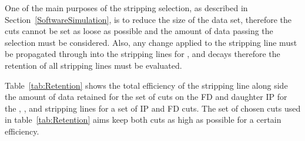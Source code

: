 One of the main purposes of the stripping selection, as described in Section~\ref{SoftwareSimulation}, is to reduce the size of the data set, therefore the cuts cannot be set as loose as possible and the amount of data passing the selection must be considered. Also, any change applied to the \bmumu stripping line must be propagated through into the stripping lines for \bhh, \bujpsik and \bsjpsiphi decays therefore the retention of all stripping lines must be evaluated.

Table~\ref{tab:Retention} shows the total efficiency of the \bsmumu stripping line along side the amount of data retained for the set of cuts on the FD \chisqd and daughter IP \chisqd for the \bmumu, \bhh, \bujpsik and \bsjpsiphi stripping lines for a set of IP \chisqd and FD \chisqd cuts. %
The set of chosen cuts used in table~\ref{tab:Retention} aims keep both cuts as high as possible for a certain \bsmumu efficiency. 



